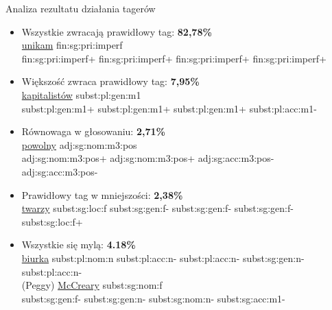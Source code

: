 \documentclass[xcolor=dvipsnames,polish]{beamer}
\newcommand{\marked}[1]{{\bf #1}}
\begin{document}
\begin{frame}{Analiza rezultatu działania tagerów}
\begin{itemize}
\item Wszystkie zwracają prawidłowy tag: \marked{82,78\%} \\
{\footnotesize \underline{unikam} fin:sg:pri:imperf\\
fin:sg:pri:imperf+ fin:sg:pri:imperf+ fin:sg:pri:imperf+ fin:sg:pri:imperf+}
\item Większość zwraca prawidłowy tag: \marked{7,95\%} \\
{\footnotesize \underline{kapitalistów} subst:pl:gen:m1 \\
subst:pl:gen:m1+ subst:pl:gen:m1+ subst:pl:gen:m1+ subst:pl:acc:m1-}
\item Równowaga w głosowaniu: \marked{2,71\%} \\
{\footnotesize \underline{powolny} adj:sg:nom:m3:pos \\
adj:sg:nom:m3:pos+ adj:sg:nom:m3:pos+ adj:sg:acc:m3:pos- adj:sg:acc:m3:pos-}
\item Prawidłowy tag w mniejszości: \marked{2,38\%} \\
{\footnotesize \underline{twarzy} subst:sg:loc:f subst:sg:gen:f- subst:sg:gen:f- subst:sg:gen:f- subst:sg:loc:f+}
\item Wszystkie się mylą: \marked{4.18\%} \\
{\footnotesize \underline{biurka} subst:pl:nom:n subst:pl:acc:n- subst:pl:acc:n- subst:sg:gen:n- subst:pl:acc:n- \\
(Peggy) \underline{McCreary} subst:sg:nom:f \\
subst:sg:gen:f- subst:sg:gen:n- subst:sg:nom:n- subst:sg:acc:m1-}
\end{itemize}
\end{frame}
\end{document}
